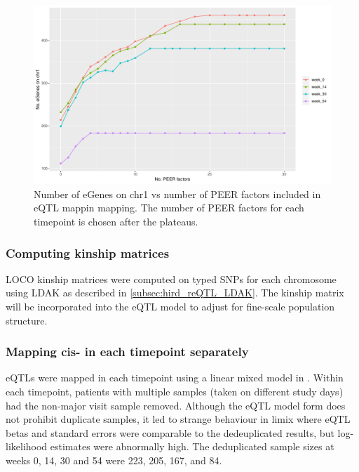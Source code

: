 \begin{figure}
    \centering
    \includegraphics[width=1.0\textwidth,page=1]{mainmatter/figures/chapter_04/count_eGenes.signif_eGenes_vs_PEER_n.dataset_multiPANTS.chr_1.pdf}
    \caption{Number of eGenes on chr1 vs number of PEER factors included in \gls{eQTL} mappin mapping. The number of PEER factors for each timepoint is chosen after the plateaus.}
    \label{fig:multipants_reqtl_PEER_k_choice}
\end{figure}

\subsubsection{Computing kinship matrices}

\Gls{LOCO} kinship matrices were computed on typed \glspl{SNP} for each chromosome using LDAK as described in \autoref{subsec:hird_reQTL_LDAK}.
The kinship matrix will be incorporated into the \gls{eQTL} model to adjust for fine-scale population structure.

\subsubsection{Mapping cis- in each timepoint separately}

\glspl{eQTL} were mapped in each timepoint using a linear mixed model in .
Within each timepoint, patients with multiple samples (taken on different study days) had the non-major visit sample removed.
%
%
Although the \gls{eQTL} model form does not prohibit duplicate samples,
it led to strange behaviour in limix where \gls{eQTL} betas and standard errors were comparable to the dedeuplicated results,
but log-likelihood estimates were abnormally high.
The deduplicated sample sizes at weeks 0, 14, 30 and 54 were 223, 205, 167, and 84.

